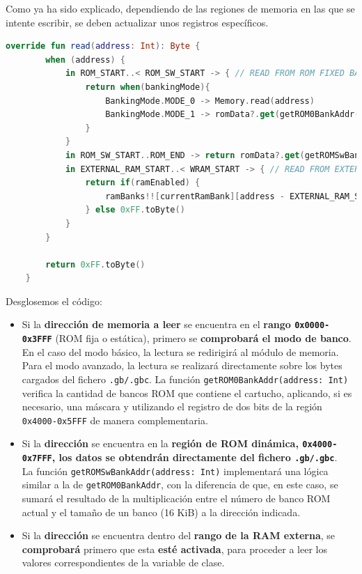 Como ya ha sido explicado, dependiendo de las regiones de memoria en las que se intente escribir, se deben actualizar unos registros específicos.

\begin{lstlisting}[language=Kotlin, caption={Lectura en regiones ROM.}, label={code:romreadkotlin}]
    override fun read(address: Int): Byte {
        when (address) {
            in ROM_START..< ROM_SW_START -> { // READ FROM ROM FIXED BANK
                return when(bankingMode){
                    BankingMode.MODE_0 -> Memory.read(address)
                    BankingMode.MODE_1 -> romData?.get(getROM0BankAddr(address)) ?: 0xFF.toByte()
                }
            }
            in ROM_SW_START..ROM_END -> return romData?.get(getROMSwBankAddr(address)) ?: 0xFF.toByte() // READ FROM SWITCHABLE ROM BANK
            in EXTERNAL_RAM_START..< WRAM_START -> { // READ FROM EXTERNAL RAM
                return if(ramEnabled) {
                    ramBanks!![currentRamBank][address - EXTERNAL_RAM_START]
                } else 0xFF.toByte()
            }
        }

        return 0xFF.toByte()
    }
\end{lstlisting}

Desglosemos el código:

\begin{itemize}
    \item Si la \textbf{dirección de memoria a leer} se encuentra en el \textbf{rango \texttt{0x0000-0x3FFF}} (ROM fija o estática), primero se \textbf{comprobará el modo de banco}. En el caso del modo básico, la lectura se redirigirá al módulo de memoria. Para el modo avanzado, la lectura se realizará directamente sobre los bytes cargados del fichero \texttt{.gb/.gbc}. La función \texttt{getROM0BankAddr(address: Int)} verifica la cantidad de bancos ROM que contiene el cartucho, aplicando, si es necesario, una máscara y utilizando el registro de dos bits de la región \texttt{0x4000-0x5FFF} de manera complementaria.

    \item Si la \textbf{dirección} se encuentra en la \textbf{región de ROM dinámica, \texttt{0x4000-0x7FFF}, los datos se obtendrán directamente del fichero \texttt{.gb/.gbc}}.\\
    La función \texttt{getROMSwBankAddr(address: Int)} implementará una lógica similar a la de \texttt{getROM0BankAddr}, con la diferencia de que, en este caso, se sumará el resultado de la multiplicación entre el número de banco ROM actual y el tamaño de un banco (16 KiB) a la dirección indicada.

    \item Si la \textbf{dirección} se encuentra dentro del \textbf{rango de la RAM externa}, se \textbf{comprobará} primero que esta \textbf{esté activada}, para proceder a leer los valores correspondientes de la variable de clase.
\end{itemize}

